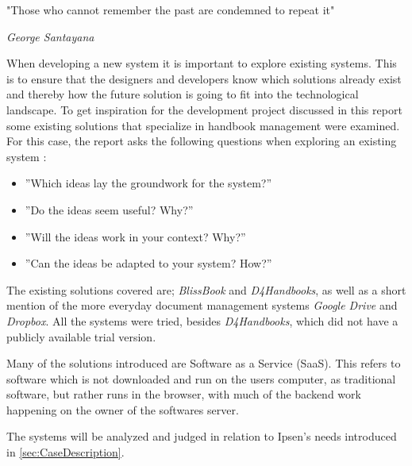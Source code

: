 \documentclass[../../master.tex]{subfiles}
\begin{document}
\epigraph{"Those who cannot remember the past are condemned to repeat it"}{\textit{George Santayana}}
When developing a new system it is important to explore existing systems.
This is to ensure that the designers and developers know which solutions already exist and thereby how the future solution is going to fit into the technological landscape.
To get inspiration for the development project discussed in this report some existing solutions that specialize in handbook management were examined.
For this case, the report asks the following questions when exploring an existing system \citep[p.~33]{Rod-Aalborg}:

\begin{itemize}
  \item ''Which ideas lay the groundwork for the system?''
  \item ''Do the ideas seem useful? Why?''
  \item ''Will the ideas work in your context? Why?''
  \item ''Can the ideas be adapted to your system? How?''
\end{itemize}

The existing solutions covered are; \textit{BlissBook} and \textit{D4Handbooks}, as well as a short mention of the more everyday document management systems \textit{Google Drive} and \textit{Dropbox}.
All the systems were tried, besides \textit{D4Handbooks}, which did not have a publicly available trial version.

Many of the solutions introduced are Software as a Service (SaaS).
This refers to software which is not downloaded and run on the users computer, as traditional software, but rather runs in the browser, with much of the backend work happening on the owner of the softwares server.

The systems will be analyzed and judged in relation to Ipsen's needs introduced in \cref{sec:CaseDescription}.
\end{document}
